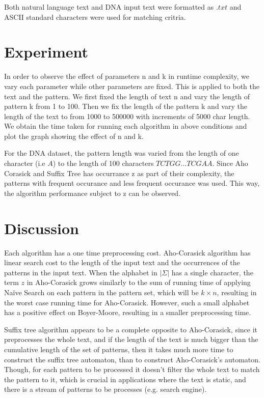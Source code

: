 \documentclass[paper=a4, fontsize=11pt]{scrartcl} %
\numberwithin{equation}{section} %
\numberwithin{figure}{section} %
\numberwithin{table}{section} %
\begin{document}
Both natural language text and DNA input text were formatted as $.txt$ and ASCII standard characters were used for matching critria.

\section{Experiment}
\par In order to observe the effect of parameters n and k in runtime complexity, we vary each parameter while other parameters are fixed. This is applied to both the text and the pattern. We first fixed the length of text n and vary the length of pattern k from 1 to 100. Then we fix the length of the pattern k and vary the length of the text to from 1000 to 500000 with increments of 5000 char length. We obtain the time taken for running each algorithm in above conditions and plot the graph showing the effect of n and k.

For the DNA dataset, the pattern length was varied from the length of one character (i.e $A$) to the length of 100 characters $TCTGG...TCGAA$. Since Aho Corasick and Suffix Tree has occurrance z as part of their complexity, the patterns with frequent occurance and less frequent occurance was used. This way, the algorithm performance subject to z can be observed. 

\section{Discussion}
\par Each algorithm has a one time preprocessing cost. Aho-Corasick algorithm has linear search cost to the length of the input text and the occurrences of the patterns in the input text. When the alphabet in $|\Sigma|$ has a single character, the term $z$ in Aho-Corasick grows similarly to the sum of running time of applying Na\"ive Search on each pattern in the pattern set, which will be $k\times n$, resulting in the worst case running time for Aho-Corasick. However, such a small alphabet has a positive effect on Boyer-Moore, resulting in a smaller preprocessing time.

\par Suffix tree algorithm appears to be a complete opposite to Aho-Corasick, since it preprocesses the whole text, and if the length of the text is much bigger than the cumulative length of the set of patterns, then it takes much more time to construct the suffix tree automaton, than to construct Aho-Corasick's automaton. Though, for each pattern to be processed it doesn't filter the whole text to match the pattern to it, which is crucial in applications where the text is static, and there is a stream of patterns to be processes (e.g. search engine).
\end{document}
